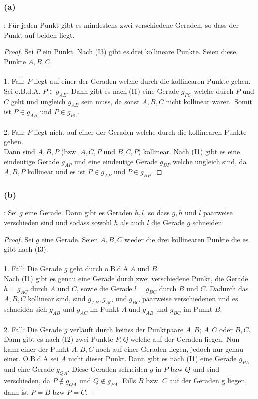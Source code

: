 \documentclass[12pt,a4paper]{article}
\newcommand{\zz}{\stackinset{c}{2.5pt}{c}{-2.5pt}{\textsf{Z}}{\textsf{Z}}}
\begin{document}
\subsubsection*{(a)} 
\zz : Für jeden Punkt gibt es mindestens zwei verschiedene Geraden, so dass der Punkt auf beiden liegt.
\begin{proof}
Sei $P$ ein Punkt. Nach (I3) gibt es drei kollineare Punkte. Seien diese Punkte $A, B, C$. \\
\\
1. Fall: $P$ liegt auf einer der Geraden welche durch die kollinearen Punkte gehen. \\ 
Sei o.B.d.A. $P \in g_{AB}$. Dann gibt es nach (I1) eine Gerade $g_{PC}$ welche durch $P$ und $C$ geht und ungleich $g_{AB}$ sein muss, da sonst $A, B, C$ nicht kollinear wären. Somit ist $P \in g_{AB}$ und $P \in g_{PC}$. \\
\\
2. Fall: $P$ liegt nicht auf einer der Geraden welche durch die kollinearen Punkte gehen. \\
Dann sind $A, B, P$ (bzw. $A, C, P$ und $B, C, P$) kollinear.
Nach (I1) gibt es eine eindeutige Gerade $g_{AP}$ und eine eindeutige Gerade $g_{BP}$ welche ungleich sind, da $A, B, P$ kollinear und es ist $P \in g_{AP}$ und $P \in g_{BP}$.
\end{proof}

\newpage
\subsubsection*{(b)} 
\zz : Sei $g$ eine Gerade. Dann gibt es Geraden $h, l$, so dass $g, h$ und $l$ paarweise verschieden sind und sodass sowohl $h$ als auch $l$ die Gerade $g$ schneiden.
\begin{proof}
Sei $g$ eine Gerade. Seien $A, B, C$ wieder die drei kollinearen Punkte die es gibt nach (I3).\\
\\
1. Fall: Die Gerade $g$ geht durch o.B.d.A $A$ und $B$.\\
Nach (I1) gibt es genau eine Gerade durch zwei verschiedene Punkt, die Gerade $h = g_{AC}$ durch $A$ und $C$, sowie die Gerade $l = g_{BC}$ durch $B$ und $C$. Dadurch das $A, B, C$ kollinear sind, sind $g_{AB}, g_{AC}$ und $g_{BC}$ paarweise verschiedenen und es schneiden sich $g_{AB}$ und $g_{AC}$ im Punkt $A$ und $g_{AB}$ und $g_{BC}$ im Punkt $B$.\\
\\
2. Fall: Die Gerade $g$ verläuft durch keines der Punktpaare $A, B$; $A, C$ oder $B, C$.\\
Dann gibt es nach (I2) zwei Punkte $P, Q$ welche auf der Geraden liegen. Nun kann einer der Punkt $A, B, C$ noch auf einer Geraden liegen, jedoch nur genau einer. O.B.d.A sei $A$ nicht dieser Punkt. Dann gibt es nach (I1) eine Gerade $g_{PA}$ und eine Gerade $g_{QA}$. Diese Geraden schneiden $g$ in $P$ bzw $Q$ und sind verschieden, da $P \notin g_{QA}$ und $Q \notin g_{PA}$. Falls $B$ bzw. $C$ auf der Geraden g liegen, dann ist $P=B$ bzw $P=C$.
\end{proof}
\end{document}
